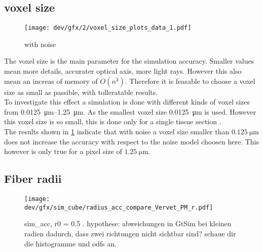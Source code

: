 \subsection{voxel size \texorpdfstring{\voxels{}}{}}
% 
% 
% 
\begin{figure}[!tp]%
\centering
\texttt{[image: dev/gfx/2/voxel\_size\_plots\_data\_1.pdf]}
\caption[voxel size model with noise]{with noise \dummy{}}
\label{fig:voxelsizeNoise}
\end{figure}
% 
The voxel size \voxelsize{} is the main parameter for the simulation accuracy.
Smaller values mean more details, accurater optical axis, more light rays.
However this also mean an increas of memory of $O(n^3)$.
Therefore it is feasable to choose a voxel size as small as passible, with tolleratable results.
\\
% 
To investigate this effect a simulation is done with different kinds of voxel sizes from \SIrange{0.0125}{1.25}{\micro\meter}.
As  the smallest voxel size \SI{0.0125}{\micro\meter} is used. 
However this voxel size is so small, this is done only for a single tissue section .
\\
%
The results shown in \cref{fig:voxelsizeNoise} indicate that with noise a voxel size smaller than $\SI{0.125}{\micro\meter}$ does not increase the accuracy with respect to the noise model choosen here.
This however is only true for a pixel size of $\SI{1.25}{\micro\meter}$.
% 
% 
% 
\subsection{Fiber radii}
% 
\begin{figure}[!t]
\centering
\texttt{[image: dev/gfx/sim\_cube/radius\_acc\_compare\_Vervet\_PM\_r.pdf]}
\caption[sim acc]{sim\_acc, r0 = 0.5 \dummy{}. hypothese: abweichungen in GtSim bei kleinen radien dadurch, dass zwei richtungen nicht sichtbar sind? schaue dir die histogramme und odfs an.}
\label{fig:accVervetPMr}
\end{figure}
% 
% 

